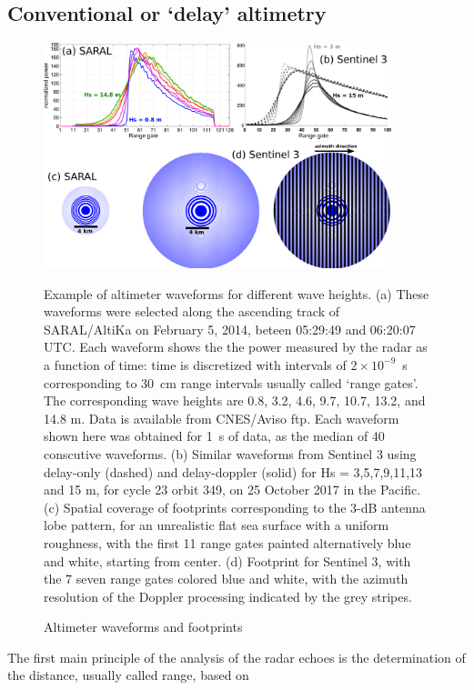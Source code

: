 \subsection{Conventional or `delay' altimetry}\label{delay}
\begin{figure}[htb]
\centerline{\includegraphics[width=0.9\textwidth]{FIGS_CH_SAT/dessin_footprint.pdf}}
  \caption{Altimeter waveforms and footprints}
    {Example of altimeter waveforms for different wave heights.}
    {(a) These waveforms were selected along the ascending track of SARAL/AltiKa on February 5, 2014, 
    beteen 05:29:49 and 06:20:07 UTC. Each waveform shows the the power measured by the radar as a function of time: 
    time is discretized with intervals of $2 \times 10^{-9}$~s corresponding to 
30~cm range intervals usually called `range gates'. The corresponding wave heights are 0.8, 3.2, 4.6, 9.7, 10.7, 13.2, and 14.8 m. 
Data is available from CNES/Aviso ftp. Each waveform shown here was obtained for 1~s of data, 
 as the median of 40 conscutive waveforms. (b) Similar waveforms from Sentinel 3 using delay-only (dashed) and delay-doppler (solid) for Hs = 3,5,7,9,11,13
and 15 m, for cycle 23 orbit 349, on 25 October 2017 in the Pacific. (c) Spatial coverage of footprints corresponding to the 3-dB antenna lobe pattern, for an 
unrealistic flat sea surface with a uniform roughness, with the first 11 range gates painted alternatively blue and white, 
starting from center. (d) Footprint for Sentinel 3, with the 7 seven range gates colored blue and white, with the azimuth resolution of the Doppler processing indicated by the grey stripes.
} \label{waveform}
\end{figure}
The first main principle of the analysis of the radar echoes is the determination  of the distance, usually called range, based on 
